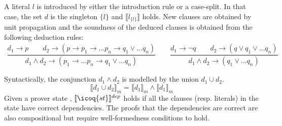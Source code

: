 \documentclass[utf8,a4paper,UKenglish,cleveref, autoref, thm-restate]{lipics-v2021}
\begin{document}
A literal $l$ is introduced by either the introduction rule or a
case-split. In that case, the set $d$ is the singleton $\{l\}$ and
$\llbracket l_{\{l \}} \rrbracket$ holds. New clauses are obtained by
unit propagation and the soundness of the deduced clauses is obtained
from the following deduction rules:
\[
  \begin{array}{c}
  \dfrac{ d_1 \to p  \qquad d_2 \to (p \to p_1 \to \dots p_n \to q_1 \lor \dots q_n) }
    {d_1 \land d_2 \to (p_1 \to \dots p_n \to q_1 \lor \dots q_n) } \qquad
  \dfrac{ d_1 \to \neg q  \qquad d_2 \to (q \lor q_1 \lor \dots q_n) }
    {d_1 \land d_2 \to (q_1 \lor \dots q_n) }\\\\
  \end{array}
\]
Syntactically, the conjunction $d_1 \land d_2$ is modelled by the union $d_1 \cup d_2$.
\[
  \llbracket d_1 \cup d_2 \rrbracket_m = \llbracket d_1 \rrbracket_m \land \llbracket d_1 \rrbracket_m
\]
Given a prover state ,
$\llbracket \icoq{st} \rrbracket^{dep}$ holds if all the clauses
(resp. literals) in the state have correct dependencies.  The proofs that the
dependencies are correct are also compositional but require
well-formedness conditions to hold.
\end{document}
